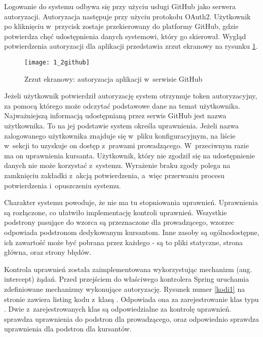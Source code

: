 Logowanie do systemu odbywa się przy użyciu usługi GitHub jako serwera autoryzacji. Autoryzacja następuje przy użyciu protokołu OAuth2. Użytkownik po kliknięciu w~przycisk zostaje przekierowany do platformy GitHub, gdzie potwierdza chęć udostępnienia danych systemowi, który go skierował. Wygląd potwierdzenia autoryzacji dla aplikacji przedstawia zrzut ekranowy na rysunku \ref{obr12}.

\begin{figure}[!h]
\centering
    \texttt{[image: 1\_2github]}
    \caption{Zrzut ekranowy: autoryzacja aplikacji w~serwisie GitHub}
    \label{obr12}
\end{figure}

Jeżeli użytkownik potwierdził autoryzację system otrzymuje token autoryzacyjny, za pomocą którego może odczytać podstawowe dane na temat użytkownika. Najważniejszą informacją udostępnianą przez serwis GitHub jest nazwa użytkownika. To na jej podstawie system określa uprawnienia. Jeżeli nazwa zalogowanego użytkownika znajduje się w~pliku konfiguracyjnym, na liście w~sekcji  to uzyskuje on dostęp z~prawami prowadzącego. W~przeciwnym razie ma on uprawnienia kursanta. Użytkownik, który nie zgodził się na udostępnienie danych nie może korzystać z~systemu. Wyrażenie braku zgody polega na zamknięciu zakładki z~akcją potwierdzenia, a~więc przerwaniu procesu potwierdzenia i~opuszczeniu systemu.

\medskip
Charakter systemu powoduje, że nie ma tu stopniowania uprawnień. Uprawnienia są rozłączone, co ułatwiło implementację kontroli uprawnień. Wszystkie podstrony pasujące do wzorca  są przeznaczone dla prowadzącego, wzorzec  odpowiada podstronom dedykowanym kursantom. Inne zasoby są ogólnodostępne, ich zawartość może być pobrana przez każdego - są to pliki statyczne, strona główna, oraz strony błędów.

\medskip
Kontrola uprawnień została zaimplementowana wykorzystując mechanizm  (ang. intercept) żądań. Przed przejściem do właściwego kontrolera Spring uruchamia zdefiniowane mechanizmy wykonujące autoryzację. Rysunek numer \ref{kodi1} na stronie \pageref{kodi1} zawiera listing kodu z~klasą . Odpowiada ona za zarejestrowanie klas typu . Dwie z~zarejestrowanych klas są odpowiedzialne za kontrolę uprawnień.  sprawdza uprawnienia do podstron dla prowadzącego, oraz odpowiednio  sprawdza uprawnienia dla podstron dla kursantów.

